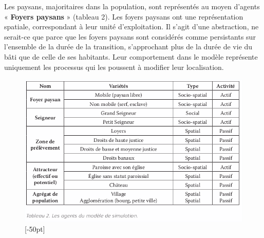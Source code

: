 Les paysans, majoritaires dans la population, sont représentés au moyen d'agents « \textbf{Foyers paysans} » (tableau 2).
Les foyers paysans ont une représentation spatiale, correspondant à leur unité d'exploitation.
Il s'agit d'une abstraction, ne serait-ce que parce que les foyers paysans sont considérés comme persistants sur l'ensemble de la durée de la transition, s'approchant plus de la durée de vie du bâti que de celle de ses habitants.
Leur comportement dans le modèle représente uniquement les processus qui les poussent à modifier leur localisation.

\begin{figure}[H]
	\centering
	\includegraphics[width=1\linewidth]{src/Chapitre_TMD/Tab2.png}
	[-50pt]
\end{figure}

